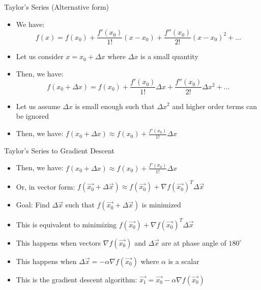 \documentclass[usenames,dvipsnames]{beamer}
\begin{document}
  \begin{frame}{Taylor's Series (Alternative form)}
    \begin{itemize}[<+->]
    \item We have:
        \begin{equation}
            f(x) = f(x_0) + \frac{f'(x_0)}{1!}(x-x_0) + \frac{f''(x_0)}{2!}(x-x_0)^2 + \ldots
        \end{equation}
    \item Let us consider $x = x_0 + \Delta x$ where $\Delta x$ is a small quantity
    \item Then, we have:
    \begin{equation}
        f(x_0 + \Delta x) = f(x_0) + \frac{f'(x_0)}{1!}\Delta x + \frac{f''(x_0)}{2!}\Delta x^2 + \ldots
    \end{equation} 
    \item Let us assume $\Delta x$ is small enough such that $\Delta x^2$ and higher order terms can be ignored
    \item Then, we have:
    $f(x_0 + \Delta x) \approx f(x_0) + \frac{f'(x_0)}{1!}\Delta x$
    \end{itemize}


	

	
  \end{frame}

  \begin{frame}{Taylor's Series  to Gradient Descent}
    \begin{itemize}[<+->]
    \item Then, we have:
    $f(x_0 + \Delta x) \approx f(x_0) + \frac{f'(x_0)}{1!}\Delta x$
    \item Or, in vector form:
    $f(\vec{x_0} + \Delta \vec{x}) \approx f(\vec{x_0}) + \nabla f(\vec{x_0})^T\Delta \vec{x}$
    \item Goal: Find $\Delta \vec{x}$ such that $f(\vec{x_0} + \Delta \vec{x})$ is minimized
    \item This is equivalent to minimizing $f(\vec{x_0}) + \nabla f(\vec{x_0})^T\Delta \vec{x}$
    \item This happens when vectors $\nabla f(\vec{x_0})$ and $\Delta \vec{x}$ are at phase angle of $180^{\circ}$
    \item This happens when $\Delta \vec{x} = -\alpha \nabla f(\vec{x_0})$ where $\alpha$ is a scalar
    \item This is the gradient descent algorithm: $\vec{x_1} = \vec{x_0} - \alpha \nabla f(\vec{x_0})$
\end{itemize}
  \end{frame}
\end{document}
